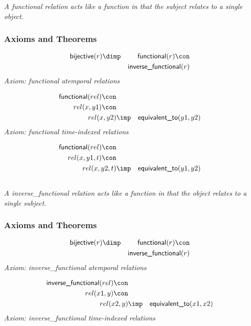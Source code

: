 \subsection{ }
\emph{A functional relation acts like a function in that the subject relates to a single object.}

\subsubsection{Axioms and Theorems}


\begin{eqnarray*}
 \pr{bijective}(r) &\dimp & \pr{functional}(r) \con \\
&& \pr{inverse\_functional}(r) 
\end{eqnarray*}
\emph{Axiom: functional atemporal relations}

\begin{eqnarray*}
 \pr{functional}(rel) \con \\
rel(x, y1) \con \\
rel(x, y2) &\imp & \pr{equivalent\_to}(y1, y2) 
\end{eqnarray*}
\emph{Axiom: functional time-indexed relations}

\begin{eqnarray*}
 \pr{functional}(rel) \con \\
rel(x, y1, t) \con \\
rel(x, y2, t) &\imp & \pr{equivalent\_to}(y1, y2) 
\end{eqnarray*}

\subsection{ }
\emph{A inverse\_functional relation acts like a function in that the object relates to a single subject.}

\subsubsection{Axioms and Theorems}


\begin{eqnarray*}
 \pr{bijective}(r) &\dimp & \pr{functional}(r) \con \\
&& \pr{inverse\_functional}(r) 
\end{eqnarray*}
\emph{Axiom: inverse\_functional atemporal relations}

\begin{eqnarray*}
 \pr{inverse\_functional}(rel) \con \\
rel(x1, y) \con \\
rel(x2, y) &\imp & \pr{equivalent\_to}(x1, x2) 
\end{eqnarray*}
\emph{Axiom: inverse\_functional time-indexed relations}

